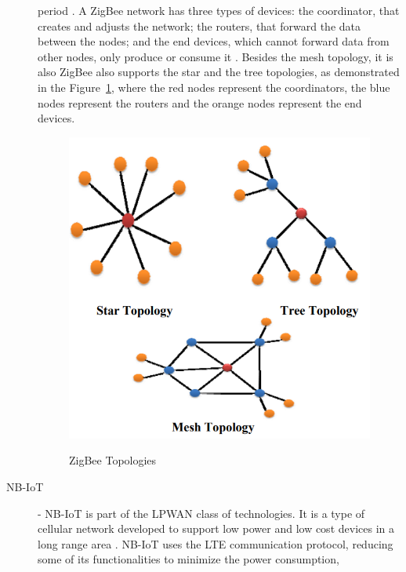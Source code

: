 \begin{description}
            period \cite{Kaushal2014}. A ZigBee network has three types of devices: the
            coordinator, that creates and adjusts the network; the routers, that forward the
            data between the nodes; and the end devices, which cannot forward data from other
            nodes, only produce or consume it \cite{Costa2018, Ramya2011}. Besides the mesh
            topology, it is also ZigBee also supports the star and the tree topologies, as
            demonstrated in the Figure~\ref{fig:zigbee_topologies}, where the red nodes
            represent the coordinators, the blue nodes represent the routers and the orange
            nodes represent the end devices.
            \begin{figure}[H]
                  \caption{ZigBee Topologies \cite{Kaushal2014}}
                  \centering
                  \includegraphics[scale=0.6]{Chapters/Figures/zigbee topologies.png}
                  \label{fig:zigbee_topologies}
            \end{figure}
      \item [NB-IoT] - \Gls{NB-IoT} is part of the \Gls{LPWAN} class of technologies. It is a
            type of cellular network developed to support low power and low cost devices in a
            long range area \cite{Beyene2017}. NB-IoT uses the \Gls{LTE} communication
            protocol, reducing some of its functionalities to minimize the power consumption,

\end{description}
